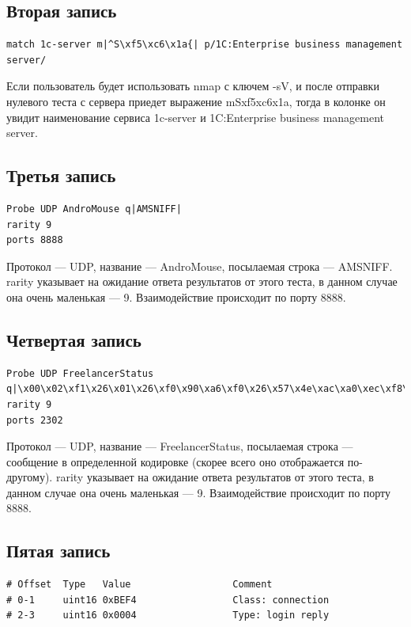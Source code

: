 \documentclass[utf8x, 12pt]{G7-32}
\begin{document}
\subsection{Вторая запись}

\begin{lstlisting}
match 1c-server m|^S\xf5\xc6\x1a{| p/1C:Enterprise business management server/
\end{lstlisting}

 Если пользователь будет использовать nmap с ключем -sV, и после отправки
  нулевого теста с сервера приедет выражение mSxf5xc6x1a, тогда в колонке  он увидит наименование сервиса 1c-server и 1C:Enterprise business management server.


\subsection{Третья запись}
\begin{lstlisting}
Probe UDP AndroMouse q|AMSNIFF|
rarity 9
ports 8888
\end{lstlisting}

Протокол --- UDP, название --- AndroMouse, посылаемая строка --- AMSNIFF.
rarity указывает на ожидание ответа результатов от этого теста, в данном случае она очень маленькая --- 9. Взаимодействие происходит по порту 8888.

\subsection{Четвертая запись}
\begin{lstlisting}
Probe UDP FreelancerStatus q|\x00\x02\xf1\x26\x01\x26\xf0\x90\xa6\xf0\x26\x57\x4e\xac\xa0\xec\xf8\x68\xe4\x8d\x21|
rarity 9
ports 2302
\end{lstlisting}

Протокол --- UDP, название --- FreelancerStatus, посылаемая строка --- сообщение в определенной кодировке (скорее всего оно отображается по-другому).
rarity указывает на ожидание ответа результатов от этого теста, в данном случае она очень маленькая --- 9. Взаимодействие происходит по порту 8888.

\subsection{Пятая запись}

\begin{lstlisting}
# Offset  Type   Value                  Comment
# 0-1     uint16 0xBEF4                 Class: connection
# 2-3     uint16 0x0004                 Type: login reply
\end{lstlisting}
\end{document}
